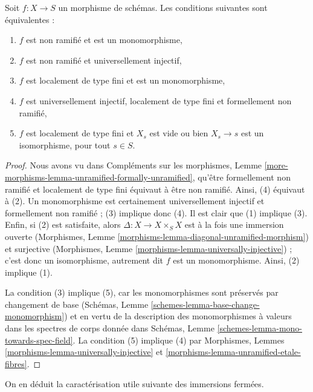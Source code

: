 \begin{lemma}
\label{lemma-universally-injective-unramified}
Soit $f : X \to S$ un morphisme de schémas.
Les conditions suivantes sont équivalentes :
\begin{enumerate}
\item $f$ est non ramifié et est un monomorphisme,
\item $f$ est non ramifié et universellement injectif,
\item $f$ est localement de type fini et est un monomorphisme,
\item $f$ est universellement injectif, localement de type fini et
formellement non ramifié,
\item $f$ est localement de type fini et $X_s$ est vide
ou bien $X_s \to s$ est un isomorphisme, pour tout $s \in S$.
\end{enumerate}
\end{lemma}

\begin{proof}
Nous avons vu dans
Compléments sur les morphismes, Lemme
\ref{more-morphisms-lemma-unramified-formally-unramified},
qu'être formellement non ramifié et localement de type fini équivaut
à être non ramifié. Ainsi, (4) équivaut à (2).
Un monomorphisme est certainement universellement injectif et
formellement non ramifié ; (3) implique donc (4).
Il est clair que (1) implique (3). Enfin, si (2) est satisfaite, alors
$\Delta : X \to X \times_S X$ est à la fois une immersion ouverte
(Morphismes, Lemme \ref{morphisms-lemma-diagonal-unramified-morphism})
et surjective
(Morphismes, Lemme \ref{morphisms-lemma-universally-injective}) ;
c'est donc un isomorphisme, autrement dit $f$ est un monomorphisme. Ainsi,
(2) implique (1).

\medskip\noindent
La condition (3) implique (5), car les monomorphismes sont préservés par
changement de base
(Schémas, Lemme \ref{schemes-lemma-base-change-monomorphism})
et en vertu de la description des monomorphismes à valeurs dans les spectres de corps
donnée dans
Schémas, Lemme \ref{schemes-lemma-mono-towards-spec-field}.
La condition (5) implique (4) par
Morphismes, Lemmes \ref{morphisms-lemma-universally-injective} et
\ref{morphisms-lemma-unramified-etale-fibres}.
\end{proof}

\noindent
On en déduit la caractérisation utile suivante des immersions fermées.

